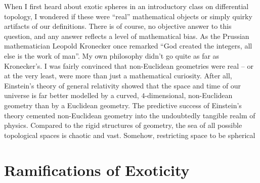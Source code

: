 When I first heard about exotic spheres in an introductory class on differential topology, I wondered if these were ``real'' mathematical objects or simply quirky artifacts of our definitions. There is of course, no objective answer to this question, and any answer reflects a level of mathematical bias.
As the Prussian mathematician Leopold Kronecker once remarked ``God created the integers, all else is the work of man''. My own philosophy didn't go quite as far as Kronecker's.
I was fairly convinced that non-Euclidean geometries were real -- or at the very least, were more than just a mathematical curiosity.
After all, Einstein's theory of general relativity showed that the space and time of our universe is far better modelled by a curved, $4$-dimensional, non-Euclidean geometry than by a Euclidean geometry. 
The predictive success of Einstein's theory cemented non-Euclidean geometry into the undoubtedly tangible realm of physics. 
Compared to the rigid structures of geometry, the sea of all possible topological spaces is chaotic and vast. Somehow, restricting space to be spherical 


\section*{Ramifications of Exoticity}



%
%

